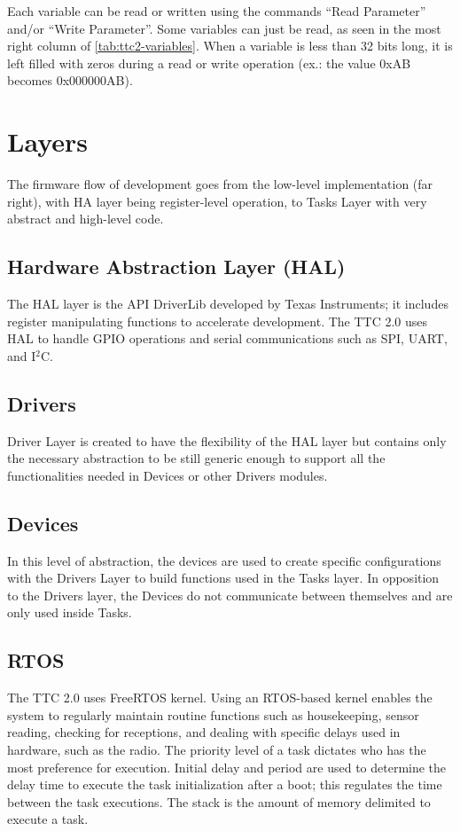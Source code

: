 Each variable can be read or written using the commands ``Read Parameter'' and/or ``Write Parameter''. Some variables can just be read, as seen in the most right column of \autoref{tab:ttc2-variables}. When a variable is less than 32 bits long, it is left filled with zeros during a read or write operation (ex.: the value 0xAB becomes 0x000000AB).

\section{Layers}

The firmware flow of development goes from the low-level implementation (far right), with HA layer being register-level operation, to Tasks Layer with very abstract and high-level code.

\subsection{Hardware Abstraction Layer (HAL)}

The HAL layer is the API DriverLib developed by Texas Instruments; it includes register manipulating functions to accelerate development. The TTC 2.0 uses HAL to handle GPIO operations and serial communications such as SPI, UART, and I$^2$C.

\subsection{Drivers}

Driver Layer is created to have the flexibility of the HAL layer but contains only the necessary abstraction to be still generic enough to support all the functionalities needed in Devices or other Drivers modules.

\subsection{Devices}

In this level of abstraction, the devices are used to create specific configurations with the Drivers Layer to build functions used in the Tasks layer. In opposition to the Drivers layer, the Devices do not communicate between themselves and are only used inside Tasks.

\subsection{RTOS}

The TTC 2.0 uses FreeRTOS kernel. Using an RTOS-based kernel enables the system to regularly maintain routine functions such as housekeeping, sensor reading, checking for receptions, and dealing with specific delays used in hardware, such as the radio. The priority level of a task dictates who has the most preference for execution. Initial delay and period are used to determine the delay time to execute the task initialization after a boot; this regulates the time between the task executions. The stack is the amount of memory delimited to execute a task.

